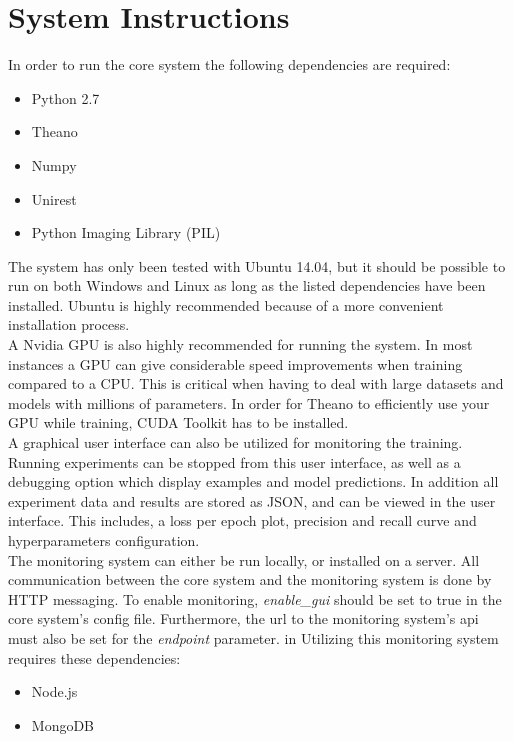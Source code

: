 \section{System Instructions}
\label{app:system_instructions}
In order to run the core system the following dependencies are required:
\begin{itemize}
\item Python 2.7
\item Theano
\item Numpy
\item Unirest
\item Python Imaging Library (PIL)
\end{itemize}

The system has only been tested with Ubuntu 14.04, but it should be possible to run on both Windows and Linux as long as the listed dependencies have been installed. Ubuntu is highly recommended because of a more convenient installation process. \\

A Nvidia GPU is also highly recommended for running the system. In most instances a GPU can give considerable speed improvements when training compared to a CPU. This is critical when having to deal with large datasets and models with millions of parameters. In order for Theano to efficiently use your GPU while training, CUDA Toolkit has to be installed. \\

A graphical user interface can also be utilized for monitoring the training. Running experiments can be stopped from this user interface, as well as a debugging option which display examples and model predictions. In addition all experiment data and results are stored as JSON, and can be viewed in the user interface. This includes, a loss per epoch plot, precision and recall curve and hyperparameters configuration. \\

The monitoring system can either be run locally, or installed on a server. All communication between the core system and the monitoring system is done by HTTP messaging. To enable monitoring, {\it enable\_gui} should be set to true in the core system's config file. Furthermore, the url to the monitoring system's api must also be set for the {\it endpoint} parameter. in  Utilizing this monitoring system requires these dependencies:
\begin{itemize}
\item Node.js
\item MongoDB
\end{itemize}


